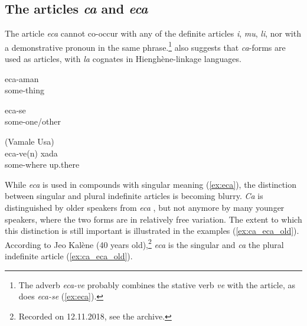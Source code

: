 \subsection{The articles \textit{ca} and \textit{eca} }
\label{ssec:eca}
The article \textit{eca} cannot co-occur with any of the definite articles \textit{i}, \textit{mu}, \textit{li}, nor with a demonstrative pronoun in the same phrase.\footnote{The adverb \textit{eca-ve}  probably combines the stative verb \textit{ve}  with the article, as does \textit{eca-se}  (\ref{ex:eca}).}  also suggests that \textit{ca}-forms are used as articles, with \textit{la} cognates in Hienghène-linkage languages.


	\ea \label{ex:eca}
	\gll	eca-aman \\
		some-thing \\
	\glt	{}%
	\z
	
	\ea
	\gll	eca-se	\\
		some-one/other\\
	\glt	{}
	\z
	
	\ea%
	(Vamale Usa)\\
	\gll eca-ve(n) xada	\\
	 some-where up.there	\\
	\glt {}	
	\z


While \textit{eca} is used in compounds with singular meaning (\ref{ex:eca}), the distinction between singular and plural indefinite articles is becoming blurry. 
\textit{Ca}  is distinguished by older speakers from \textit{eca} , but not anymore by many younger speakers, where the two forms are in relatively free variation. The extent to which this distinction is still important is illustrated in the examples (\ref{ex:ca_eca_old}). According to Jeo Kalène (40 years old),\footnote{Recorded on 12.11.2018, see the archive.} \textit{eca} is the singular and \textit{ca} the plural indefinite article (\ref{ex:ca_eca_old}). 



